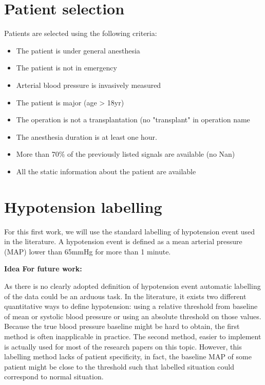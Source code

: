 \documentclass[a4paper,12pt]{article}
\begin{document}
\section{Patient selection}
Patients are selected using the following criteria:

\begin{itemize}
    \item The patient is under general anesthesia
    \item The patient is not in emergency
    \item Arterial blood pressure is invasively measured
    \item The patient is major (age > 18yr)
    \item The operation is not a transplantation (no "transplant" in operation name
    \item The anesthesia duration is at least one hour.
    \item More than 70\% of the previously listed signals are available (no Nan) 
    \item All the static information about the patient are available
\end{itemize}

\section{Hypotension labelling}


For this first work, we will use the standard labelling of hypotension event used in the literature. A hypotension event is defined as a mean arterial pressure (MAP) lower than 65mmHg for more than 1 minute. \medskip

\textbf{Idea For future work:}



As there is no clearly adopted definition of hypotension event automatic labelling of the data could be an arduous task. In the literature, it exists two different quantitative ways to define hypotension: using a relative threshold from baseline of mean or systolic blood pressure or using an absolute threshold on those values. Because the true blood pressure baseline might be hard to obtain, the first method is often inapplicable in practice. The second method, easier to implement is actually used for most of the research papers on this topic. However, this labelling method lacks of patient specificity, in fact, the baseline MAP of some patient might be close to the threshold such that labelled situation could correspond to normal situation. \medskip
\end{document}
